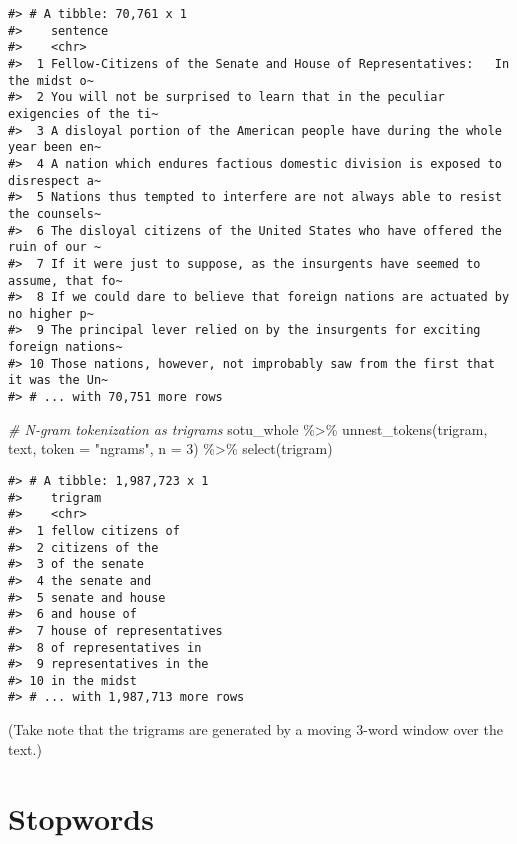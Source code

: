 \documentclass[
]{book}
\newenvironment{Shaded}{\begin{snugshade}}{\end{snugshade}}
\newcommand{\AttributeTok}[1]{\textcolor[rgb]{0.77,0.63,0.00}{#1}}
\newcommand{\CommentTok}[1]{\textcolor[rgb]{0.56,0.35,0.01}{\textit{#1}}}
\newcommand{\DecValTok}[1]{\textcolor[rgb]{0.00,0.00,0.81}{#1}}
\newcommand{\FunctionTok}[1]{\textcolor[rgb]{0.00,0.00,0.00}{#1}}
\newcommand{\NormalTok}[1]{#1}
\newcommand{\SpecialCharTok}[1]{\textcolor[rgb]{0.00,0.00,0.00}{#1}}
\newcommand{\StringTok}[1]{\textcolor[rgb]{0.31,0.60,0.02}{#1}}
\begin{document}
\begin{verbatim}
#> # A tibble: 70,761 x 1
#>    sentence                                                                     
#>    <chr>                                                                        
#>  1 Fellow-Citizens of the Senate and House of Representatives:   In the midst o~
#>  2 You will not be surprised to learn that in the peculiar exigencies of the ti~
#>  3 A disloyal portion of the American people have during the whole year been en~
#>  4 A nation which endures factious domestic division is exposed to disrespect a~
#>  5 Nations thus tempted to interfere are not always able to resist the counsels~
#>  6 The disloyal citizens of the United States who have offered the ruin of our ~
#>  7 If it were just to suppose, as the insurgents have seemed to assume, that fo~
#>  8 If we could dare to believe that foreign nations are actuated by no higher p~
#>  9 The principal lever relied on by the insurgents for exciting foreign nations~
#> 10 Those nations, however, not improbably saw from the first that it was the Un~
#> # ... with 70,751 more rows
\end{verbatim}

\begin{Shaded}
\begin{Highlighting}[]
\CommentTok{\# N{-}gram tokenization as trigrams}
\NormalTok{sotu\_whole }\SpecialCharTok{\%\textgreater{}\%}
  \FunctionTok{unnest\_tokens}\NormalTok{(trigram, text, }\AttributeTok{token =} \StringTok{"ngrams"}\NormalTok{, }\AttributeTok{n =} \DecValTok{3}\NormalTok{) }\SpecialCharTok{\%\textgreater{}\%} 
  \FunctionTok{select}\NormalTok{(trigram)}
\end{Highlighting}
\end{Shaded}

\begin{verbatim}
#> # A tibble: 1,987,723 x 1
#>    trigram                 
#>    <chr>                   
#>  1 fellow citizens of      
#>  2 citizens of the         
#>  3 of the senate           
#>  4 the senate and          
#>  5 senate and house        
#>  6 and house of            
#>  7 house of representatives
#>  8 of representatives in   
#>  9 representatives in the  
#> 10 in the midst            
#> # ... with 1,987,713 more rows
\end{verbatim}

(Take note that the trigrams are generated by a moving 3-word window over the text.)

\hypertarget{stopwords}{%
\section{Stopwords}\label{stopwords}}
\end{document}
